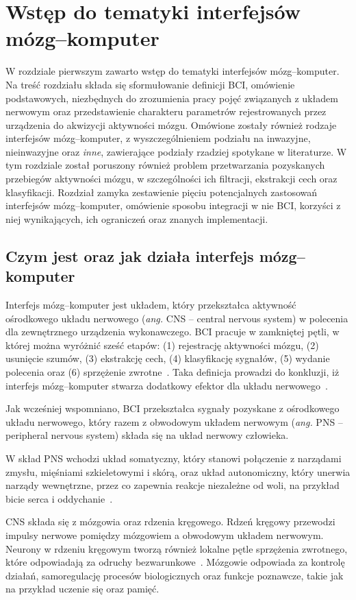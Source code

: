 \documentclass[skorowidz,skroty]{dyplomWEZUT}
\begin{document}
\chapter{Wstęp do tematyki interfejsów mózg--komputer}
W rozdziale pierwszym zawarto wstęp do tematyki interfejsów mózg--komputer. Na treść rozdziału składa się sformułowanie definicji BCI, omówienie podstawowych, niezbędnych do zrozumienia pracy pojęć związanych z układem nerwowym oraz przedstawienie charakteru parametrów rejestrowanych przez urządzenia do akwizycji aktywności mózgu. Omówione zostały również rodzaje interfejsów mózg--komputer, z wyszczególnieniem podziału na inwazyjne, nieinwazyjne oraz \textit{inne}, zawierające podziały rzadziej spotykane w literaturze. W tym rozdziale został poruszony również problem przetwarzania pozyskanych przebiegów aktywności mózgu, w szczególności ich filtracji, ekstrakcji cech oraz klasyfikacji. Rozdział zamyka zestawienie pięciu potencjalnych zastosowań interfejsów mózg--komputer, omówienie sposobu integracji w nie BCI, korzyści z niej wynikających, ich ograniczeń oraz znanych implementacji.

\section{Czym jest oraz jak działa interfejs mózg--komputer}
Interfejs mózg--komputer jest układem, który przekształca aktywność ośrodkowego układu nerwowego (\textit{ang.} CNS -- central nervous system) w polecenia dla zewnętrznego urządzenia wykonawczego. BCI pracuje w zamkniętej pętli, w której można wyróżnić sześć etapów: (1) rejestrację aktywności mózgu, (2) usunięcie szumów, (3) ekstrakcję cech, (4) klasyfikację sygnałów, (5) wydanie polecenia oraz (6) sprzężenie zwrotne~\cite{bci_foundations}. Taka definicja prowadzi do konkluzji, iż interfejs mózg--komputer stwarza dodatkowy efektor dla układu nerwowego~\cite{bci_principles}.

Jak wcześniej wspomniano, BCI przekształca sygnały pozyskane z ośrodkowego układu nerwowego, który razem z obwodowym układem nerwowym (\textit{ang.} PNS -- peripheral nervous system) składa się na układ nerwowy człowieka.

W skład PNS wchodzi układ somatyczny, który stanowi połączenie z narządami zmysłu, mięśniami szkieletowymi i skórą, oraz układ autonomiczny, który unerwia narządy wewnętrzne, przez co zapewnia reakcje niezależne od woli, na przykład bicie serca i oddychanie~\cite{bci_introduction}.

CNS składa się z mózgowia oraz rdzenia kręgowego. Rdzeń kręgowy przewodzi impulsy nerwowe pomiędzy mózgowiem a obwodowym układem nerwowym. Neurony w rdzeniu kręgowym tworzą również lokalne pętle sprzężenia zwrotnego, które odpowiadają za odruchy bezwarunkowe~\cite{bci_introduction}. Mózgowie odpowiada za kontrolę działań, samoregulację procesów biologicznych oraz funkcje poznawcze, takie jak na przykład uczenie się oraz pamięć.
\end{document}
